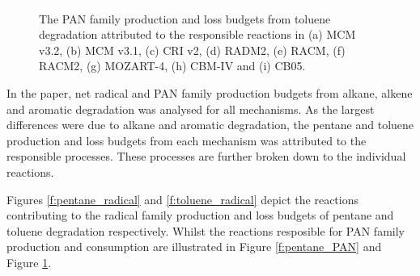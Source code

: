 \begin{figure}
    \begin{center}
        \includegraphics[width=\textwidth]{img/toluene_pan_budget_reactions}
        \caption{The PAN family production and loss budgets from toluene degradation attributed to the responsible reactions in (a) MCM v3.2, (b) MCM v3.1, (c) CRI v2, (d) RADM2, (e) RACM, (f) RACM2, (g) MOZART-4, (h) CBM-IV and (i) CB05.}
        \label{f:toluene_PAN}
    \end{center}
\end{figure} 

In the paper, net radical and PAN family production budgets from alkane, alkene and aromatic degradation was analysed for all mechanisms. 
As the largest differences were due to alkane and aromatic degradation, the pentane and toluene production and loss budgets from each mechanism was attributed to the responsible processes. 
These processes are further broken down to the individual reactions. 

Figures \ref{f:pentane_radical} and \ref{f:toluene_radical} depict the reactions contributing to the radical family production and loss budgets of pentane and toluene degradation respectively. 
Whilst the reactions resposible for PAN family production and consumption are illustrated in Figure \ref{f:pentane_PAN} and Figure \ref{f:toluene_PAN}.
